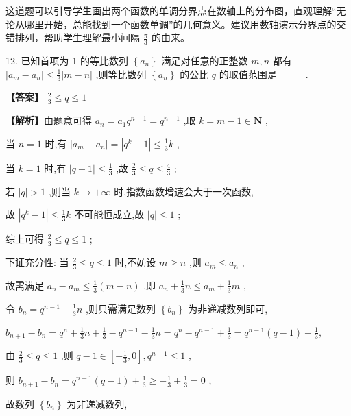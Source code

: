 \documentclass[10pt]{article}
\begin{document}
\begin{tipbox}[教学提示]
这道题可以引导学生画出两个函数的单调分界点在数轴上的分布图，直观理解``无论从哪里开始，总能找到一个函数单调''的几何意义。建议用数轴演示分界点的交错排列，帮助学生理解最小间隔 \(\frac{\pi}{3}\) 的由来。
\end{tipbox}

12. 已知首项为 1 的等比数列 \(\left\{  {a}_{n}\right\}\) 满足对任意的正整数 \(m,n\) 都有 \(\left| {{a}_{m} - {a}_{n}}\right|  \leq  \frac{1}{3}\left| {m - n}\right|\) ,则等比数列 \(\left\{  {a}_{n}\right\}\) 的公比 \(q\) 的取值范围是\_\_\_\_.

\textbf{【答案】} \(\frac{2}{3} \leq  q \leq  1\)

\textbf{【解析】}由题意可得 \({a}_{n} = {a}_{1}{q}^{n - 1} = {q}^{n - 1}\) ,取 \(k = m - 1 \in  \mathbf{N}\) ,

当 \(n = 1\) 时,有 \(\left| {{a}_{m} - {a}_{n}}\right|  = \left| {{q}^{k} - 1}\right|  \leq  \frac{1}{3}k\) ,

当 \(k = 1\) 时,有 \(\left| {q - 1}\right|  \leq  \frac{1}{3}\) ,故 \(\frac{2}{3} \leq  q \leq  \frac{4}{3}\) ;

若 \(\left| q\right|  > 1\) ,则当 \(k \rightarrow   + \infty\) 时,指数函数增速会大于一次函数,

故 \(\left| {{q}^{k} - 1}\right|  \leq  \frac{1}{3}k\) 不可能恒成立,故 \(\left| q\right|  \leq  1\) ;

综上可得 \(\frac{2}{3} \leq  q \leq  1\) ;

下证充分性: 当 \(\frac{2}{3} \leq  q \leq  1\) 时,不妨设 \(m \geq  n\) ,则 \({a}_{m} \leq  {a}_{n}\) ,

故需满足 \({a}_{n} - {a}_{m} \leq  \frac{1}{3}\left( {m - n}\right)\) ,即 \({a}_{n} + \frac{1}{3}n \leq  {a}_{m} + \frac{1}{3}m\) ,

令 \({b}_{n} = {q}^{n - 1} + \frac{1}{3}n\) ,则只需满足数列 \(\left\{  {b}_{n}\right\}\) 为非递减数列即可,

\({b}_{n + 1} - {b}_{n} = {q}^{n} + \frac{1}{3}n + \frac{1}{3} - {q}^{n - 1} - \frac{1}{3}n = {q}^{n} - {q}^{n - 1} + \frac{1}{3} = {q}^{n - 1}\left( {q - 1}\right)  + \frac{1}{3},\)

由 \(\frac{2}{3} \leq  q \leq  1\) ,则 \(q - 1 \in  \left\lbrack  {-\frac{1}{3},0}\right\rbrack  ,{q}^{n - 1} \leq  1\) ,

则 \({b}_{n + 1} - {b}_{n} = {q}^{n - 1}\left( {q - 1}\right)  + \frac{1}{3} \geq   - \frac{1}{3} + \frac{1}{3} = 0\) ,

故数列 \(\left\{  {b}_{n}\right\}\) 为非递减数列,
\end{document}
